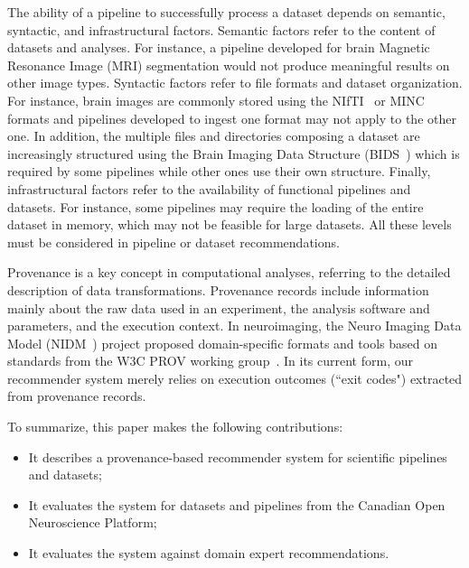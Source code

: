 \documentclass[conference]{IEEEtran}
\begin{document}
The ability of a pipeline to successfully process a dataset depends on
semantic, syntactic, and infrastructural factors. Semantic factors refer to
the content of datasets and analyses. For instance, a pipeline developed
for brain Magnetic Resonance Image (MRI) segmentation would not produce
meaningful results on other image types. Syntactic factors refer to file
formats and dataset organization. For instance, brain images are commonly
stored using the NIfTI~\cite{larobina2014medical} or
MINC~\cite{vincent2016minc} formats and pipelines developed to ingest one
format may not apply to the other one. In addition, the multiple files and
directories composing a dataset are increasingly structured using the Brain
Imaging Data Structure (BIDS~\cite{bids}) which is required by some
pipelines while other ones use their own structure. Finally,
infrastructural factors refer to the availability of functional pipelines
and datasets. For instance, some pipelines may require the loading of the
entire dataset in memory, which may not be feasible for large datasets. All
these levels must be considered in pipeline or dataset
recommendations.

Provenance is a key concept in computational analyses, referring to the
detailed description of data transformations. Provenance records include
information mainly about the raw data used in an experiment, the analysis
software and parameters, and the execution context. In neuroimaging, the
Neuro Imaging Data Model (NIDM~\cite{maumet2016sharing}) project proposed domain-specific
formats and tools based on standards from the W3C PROV working
group~\cite{missier2013w3c}. In its current form, our
recommender system merely relies on execution outcomes (``exit codes")
extracted from provenance records.

To summarize, this paper makes the following contributions:
\begin{itemize}
\item It describes a provenance-based recommender system for scientific
pipelines and datasets;
\item It evaluates the system for datasets and pipelines from the Canadian
Open Neuroscience Platform;
\item It evaluates the system against domain expert recommendations.
\end{itemize}

\end{document}
